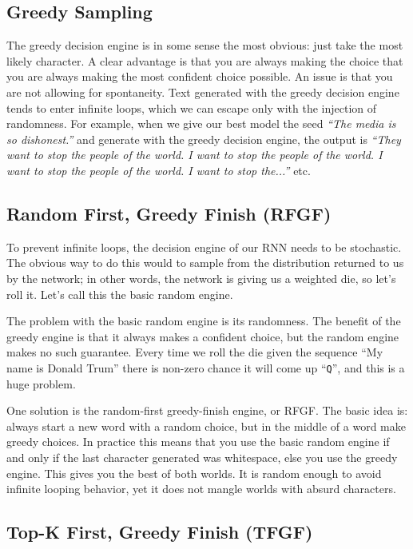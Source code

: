 \documentclass{article}
\begin{document}
\subsection{Greedy Sampling}\label{sec:greedySampling}

The greedy decision engine is in some sense the most obvious: just take the most likely character. A clear advantage is that you are always making the choice that you are always making the most confident choice possible. An issue is that you are not allowing for spontaneity. Text generated with the greedy decision engine tends to enter infinite loops, which we can escape only with the injection of randomness. For example, when we give our best model the seed \textit{``The media is so dishonest.''} and generate with the greedy decision engine, the output is \textit{``They want to stop the people of the world. I want to stop the people of the world. I want to stop the people of the world. I want to stop the...''} etc.

\subsection{Random First, Greedy Finish (RFGF)}

To prevent infinite loops, the decision engine of our RNN needs to be stochastic. The obvious way to do this would to sample from the distribution returned to us by the network; in other words, the network is giving us a weighted die, so let's roll it. Let's call this the basic random engine.

The problem with the basic random engine is its randomness. The benefit of the greedy engine is that it always makes a confident choice, but the random engine makes no such guarantee. Every time we roll the die given the sequence ``My name is Donald Trum'' there is non-zero chance it will come up ``\texttt{Q}'', and this is a huge problem.

One solution is the random-first greedy-finish engine, or RFGF. The basic idea is: always start a new word with a random choice, but in the middle of a word make greedy choices. In practice this means that you use the basic random engine if and only if the last character generated was whitespace, else you use the greedy engine. This gives you the best of both worlds. It is random enough to avoid infinite looping behavior, yet it does not mangle worlds with absurd characters.

\subsection{Top-K First, Greedy Finish (TFGF)}
\end{document}
